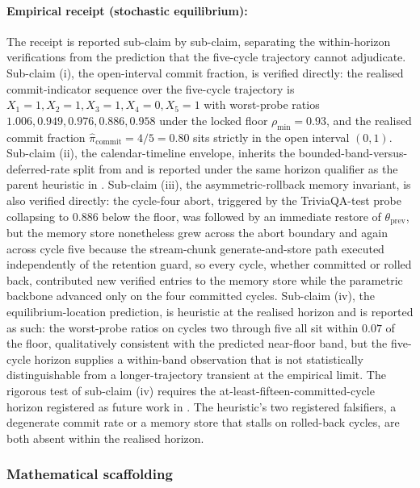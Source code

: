 \paragraph{Empirical receipt (stochastic equilibrium):} The receipt is reported sub-claim by sub-claim, separating the within-horizon verifications from the prediction that the five-cycle trajectory cannot adjudicate. Sub-claim (i), the open-interval commit fraction, is verified directly: the realised commit-indicator sequence over the five-cycle trajectory is $X_1{=}1, X_2{=}1, X_3{=}1, X_4{=}0, X_5{=}1$ with worst-probe ratios $1.006, 0.949, 0.976, 0.886, 0.958$ under the locked floor $\rho_{\min} = 0.93$, and the realised commit fraction $\widehat{\pi}_{\mathrm{commit}} = 4/5 = 0.80$ sits strictly in the open interval $(0,1)$. Sub-claim (ii), the calendar-timeline envelope, inherits the bounded-band-versus-deferred-rate split from  and is reported under the same horizon qualifier as the parent heuristic in . Sub-claim (iii), the asymmetric-rollback memory invariant, is also verified directly: the cycle-four abort, triggered by the TriviaQA-test probe collapsing to $0.886$ below the floor, was followed by an immediate restore of $\theta_{\mathrm{prev}}$, but the memory store nonetheless grew across the abort boundary and again across cycle five because the stream-chunk generate-and-store path executed independently of the retention guard, so every cycle, whether committed or rolled back, contributed new verified entries to the memory store while the parametric backbone advanced only on the four committed cycles. Sub-claim (iv), the equilibrium-location prediction, is heuristic at the realised horizon and is reported as such: the worst-probe ratios on cycles two through five all sit within $0.07$ of the floor, qualitatively consistent with the predicted near-floor band, but the five-cycle horizon supplies a within-band observation that is not statistically distinguishable from a longer-trajectory transient at the empirical limit. The rigorous test of sub-claim (iv) requires the at-least-fifteen-committed-cycle horizon registered as future work in . The heuristic's two registered falsifiers, a degenerate commit rate or a memory store that stalls on rolled-back cycles, are both absent within the realised horizon.

\subsubsection{Mathematical scaffolding}
\label{sec:theorem-scaffolding}

